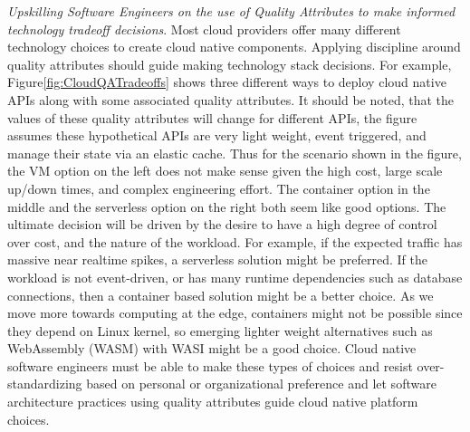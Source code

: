 \documentclass[conference]{IEEEtran}
\begin{document}
\textit{Upskilling Software Engineers on the use of Quality Attributes to make informed technology tradeoff decisions}. Most cloud providers offer many different technology choices to create cloud native components.  Applying discipline around quality attributes should guide making technology stack decisions. For example, Figure\ref{fig:CloudQATradeoffs} shows three different ways to deploy cloud native APIs along with some associated quality attributes.  It should be noted, that the values of these quality attributes will change for different APIs, the figure assumes these hypothetical APIs are very light weight, event triggered, and manage their state via an elastic cache.  Thus for the scenario shown in the figure, the VM option on the left does not make sense given the high cost, large scale up/down times, and complex engineering effort.  The container option in the middle and the serverless option on the right both seem like good options.  The ultimate decision will be driven by the desire to have a high degree of control over cost, and the nature of the workload. For example, if the expected traffic has massive near realtime spikes, a serverless solution might be preferred. If the workload is not event-driven, or has many runtime dependencies such as database connections, then a container based solution might be a better choice. As we move more towards computing at the edge, containers might not be possible since they depend on Linux kernel, so emerging lighter weight alternatives such as WebAssembly (WASM) with WASI\cite{WASI} might be a good choice.  Cloud native software engineers must be able to make these types of choices and resist over-standardizing based on personal or organizational preference and let software architecture practices using quality attributes guide cloud native platform choices. 
\end{document}
